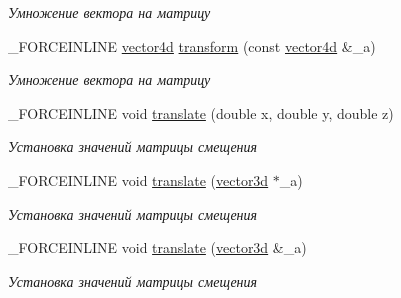 \begin{DoxyCompactItemize}
\begin{DoxyCompactList}\small\item\em Умножение вектора на матрицу \end{DoxyCompactList}\item 
\hypertarget{classbt_1_1matrix4d_a281c90af881eb7960edf29f83264d2a2}{\-\_\-\-F\-O\-R\-C\-E\-I\-N\-L\-I\-N\-E \hyperlink{classbt_1_1vector4d}{vector4d} \hyperlink{classbt_1_1matrix4d_a281c90af881eb7960edf29f83264d2a2}{transform} (const \hyperlink{classbt_1_1vector4d}{vector4d} \&\-\_\-a)}\label{classbt_1_1matrix4d_a281c90af881eb7960edf29f83264d2a2}

\begin{DoxyCompactList}\small\item\em Умножение вектора на матрицу \end{DoxyCompactList}\item 
\hypertarget{classbt_1_1matrix4d_a9201616467cf62d8c3b12a81705f8c8a}{\-\_\-\-F\-O\-R\-C\-E\-I\-N\-L\-I\-N\-E void \hyperlink{classbt_1_1matrix4d_a9201616467cf62d8c3b12a81705f8c8a}{translate} (double x, double y, double z)}\label{classbt_1_1matrix4d_a9201616467cf62d8c3b12a81705f8c8a}

\begin{DoxyCompactList}\small\item\em Установка значений матрицы смещения \end{DoxyCompactList}\item 
\hypertarget{classbt_1_1matrix4d_a16d5e17be690cced19ed1d460cab2a38}{\-\_\-\-F\-O\-R\-C\-E\-I\-N\-L\-I\-N\-E void \hyperlink{classbt_1_1matrix4d_a16d5e17be690cced19ed1d460cab2a38}{translate} (\hyperlink{classbt_1_1vector3d}{vector3d} $\ast$\-\_\-a)}\label{classbt_1_1matrix4d_a16d5e17be690cced19ed1d460cab2a38}

\begin{DoxyCompactList}\small\item\em Установка значений матрицы смещения \end{DoxyCompactList}\item 
\hypertarget{classbt_1_1matrix4d_ad5f92c8f287e444228c91522a56477b8}{\-\_\-\-F\-O\-R\-C\-E\-I\-N\-L\-I\-N\-E void \hyperlink{classbt_1_1matrix4d_ad5f92c8f287e444228c91522a56477b8}{translate} (\hyperlink{classbt_1_1vector3d}{vector3d} \&\-\_\-a)}\label{classbt_1_1matrix4d_ad5f92c8f287e444228c91522a56477b8}

\begin{DoxyCompactList}\small\item\em Установка значений матрицы смещения \end{DoxyCompactList}\end{DoxyCompactItemize}


